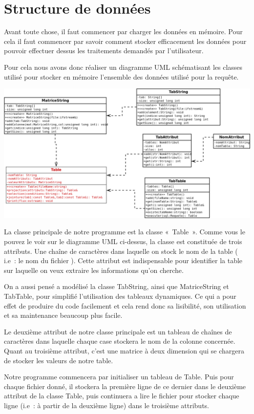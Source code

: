 \documentclass[oneside,13pt,a4paper]{report}
\begin{document}
\section{Structure de données}
Avant toute chose, il faut commencer par charger les données en mémoire. Pour cela il faut commencer par savoir comment stocker efficacement les données pour pouvoir effectuer dessus les traitements demandés par l’utilisateur.

Pour cela nous avons donc réaliser un diagramme UML schématisant les classes utilisé pour stocker en mémoire l’ensemble des données utilisé pour la requête.

\includegraphics[width=1\textwidth]{img/sql.png}\par

La classe principale de notre programme est la classe « Table ». Comme vous le pouvez le voir sur le diagramme UML ci-dessus, la classe est constituée de trois attributs. Une chaîne de caractères dans laquelle on stock le nom de la table ( i.e : le nom du fichier ). Cette attribut est indispensable pour identifier la table sur laquelle on veux extraire les informations qu’on cherche.

On a aussi pensé a modélisé la classe TabString, ainsi que MatriceString et TabTable, pour simplifié l’utilisation des tableaux dynamiques. Ce qui a pour effet de produire du code facilement et cela rend donc sa lisibilité, son utilisation et sa maintenance beaucoup plus facile.

Le deuxième attribut de notre classe principale est un tableau de chaînes de caractères dans laquelle chaque case stockera le nom de la colonne concernée. Quant au troisième attribut, c’est une matrice à deux dimension qui se chargera de stocker les valeurs de notre table.

Notre programme commencera par initialiser un tableau de Table. Puis pour chaque fichier donné, il stockera la première ligne de ce dernier dans le deuxième attribut de la classe Table, puis continuera a lire le fichier pour stocker chaque ligne (i.e : à partir de la deuxième ligne) dans le troisième attributs.
\end{document}
